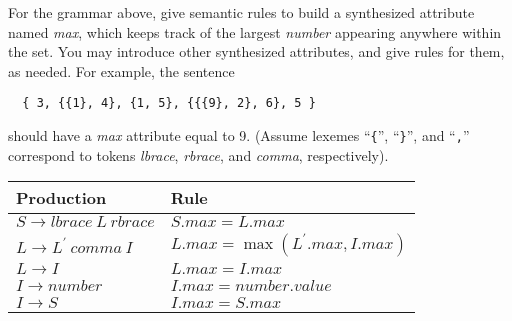 \documentclass[10pt]{article}
\begin{document}
For the grammar above, give semantic rules to build
a synthesized attribute named \emph{max},
which keeps track of the largest \emph{number} appearing anywhere
within the set.
You may introduce other synthesized attributes,
and give rules for them,
as needed.
For example, the sentence
\begin{verbatim}
  { 3, {{1}, 4}, {1, 5}, {{{9}, 2}, 6}, 5 }
\end{verbatim}
should have a \emph{max} attribute equal to 9.
(Assume lexemes ``\verb|{|'', ``\verb|}|'', and ``\verb|,|''
correspond to tokens \emph{lbrace}, \emph{rbrace},
and \emph{comma}, respectively).
\begin{framed}
\centering
\begin{tabular}{ll}
    Production                                              & Rule \\
    \hline
    $S  \rightarrow  \mathit{lbrace} ~L~ \mathit{rbrace}$   & $S.\mathit{max} = L.\mathit{max}$ \\
    $L  \rightarrow  L^\prime ~\mathit{comma}~ I$           & $L.\mathit{max} = \max(L^\prime.\mathit{max}, I.\mathit{max})$ \\
    $L  \rightarrow  I$                                     & $L.\mathit{max} = I.\mathit{max}$ \\
    $I  \rightarrow  \mathit{number}$                       & $I.\mathit{max} = \mathit{number}.\mathit{value}$ \\
    $I  \rightarrow  S$                                     & $I.\mathit{max} = S.\mathit{max}$ \\
\end{tabular}
\end{framed}
\end{document}
